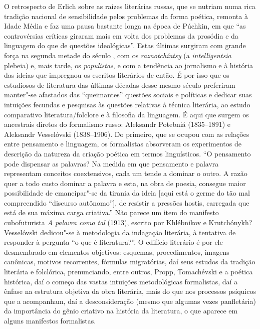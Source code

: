 O retrospecto de Erlich sobre as raízes literárias russas, que se nutriam
numa rica tradição nacional de sensibilidade pelos problemas da forma
poética, remonta à Idade Média e faz uma pausa bastante longa na época de
Púchkin, em que ``as controvérsias críticas giraram mais em volta dos
problemas da prosódia e da linguagem do que de questões ideológicas''.
Estas últimas surgiram com grande força na segunda metade do século ,
com os \emph{raznotchíntsy} (a \emph{intelligentsia} plebeia)
e, mais tarde, os \emph{populistas}, e com a tendência ao jornalismo e à
história das ideias que impregnou os escritos literários de então. É por
isso que os estudiosos de literatura das últimas décadas desse mesmo século
preferiram manter"-se afastados das ``queimantes'' questões sociais e políticas e
dedicar suas intuições fecundas e pesquisas às questões relativas
 à técnica literária, ao estudo comparativo literatura/folclore
e à filosofia da linguagem. É aqui que surgem os ancestrais diretos do
formalismo russo: Aleksandr Potebniá (1835--1891) e Aleksandr Vesselóvski (1838--1906).
Do primeiro, que se ocupou com as relações entre pensamento e linguagem,
os formalistas absorveram os experimentos de descrição da natureza da
criação poética em termos linguísticos. ``O pensamento pode dispensar as
palavras? Na medida em que pensamento e palavra
representam conceitos coextensivos, cada um tende a dominar o outro. A
razão quer a todo custo dominar a palavra e esta, na obra de poesia,
consegue maior possibilidade de emancipar"-se da tirania da ideia [aqui
está o germe do tão mal compreendido ``discurso autônomo''], de
resistir a pressões hostis, carregada que está de sua máxima carga
criativa.'' Não parece um item do manifesto cubofuturista \emph{A palavra como
tal} (1913), escrito por Khlébnikov e Krutchónykh? Vesselóvski dedicou"-se à metodologia da indagação literária, à
tentativa de responder à pergunta ``o que é literatura?''. O edifício
literário é por ele desmembrado em elementos objetivos: esquemas,
procedimentos, imagens canônicas, motivos recorrentes, fórmulas
migratórias, daí seus estudos da tradição literária e folclórica,
prenunciando, entre outros, Propp, Tomachévski e a poética histórica,
daí o começo das vastas intuições metodológicas formalistas, daí a
ênfase na estrutura objetiva da obra literária, mais do que nos
processos psíquicos que a acompanham, daí a desconsideração (mesmo que
algumas vezes panfletária) da importância do gênio criativo na
história da literatura, o que aparece em alguns manifestos formalistas.

